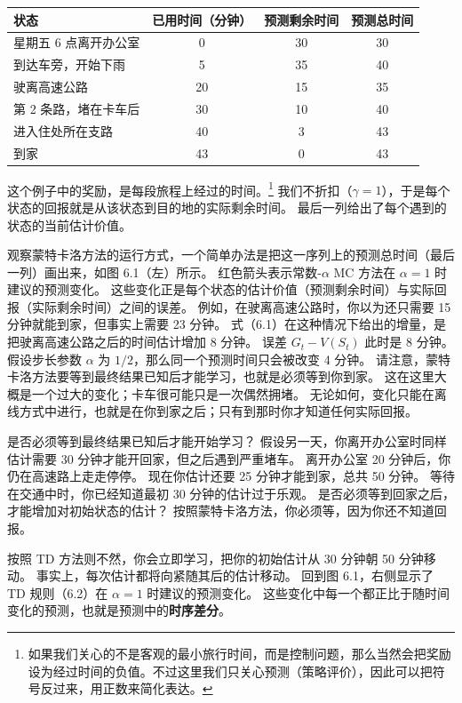 \documentclass[UTF8,12pt,a4paper,fontset=fandol]{ctexart}
\begin{document}
\begin{center}
\begin{tabular}{lccc}
\toprule
状态 & 已用时间（分钟） & 预测剩余时间 & 预测总时间 \\
\midrule
星期五 6 点离开办公室 & 0 & 30 & 30 \\
到达车旁，开始下雨 & 5 & 35 & 40 \\
驶离高速公路 & 20 & 15 & 35 \\
第 2 条路，堵在卡车后 & 30 & 10 & 40 \\
进入住处所在支路 & 40 & 3 & 43 \\
到家 & 43 & 0 & 43 \\
\bottomrule
\end{tabular}
\end{center}

这个例子中的奖励，是每段旅程上经过的时间。\footnote{如果我们关心的不是客观的最小旅行时间，而是控制问题，那么当然会把奖励设为经过时间的负值。不过这里我们只关心预测（策略评价），因此可以把符号反过来，用正数来简化表达。}
我们不折扣（$\gamma=1$），于是每个状态的回报就是从该状态到目的地的实际剩余时间。
最后一列给出了每个遇到的状态的当前估计价值。

观察蒙特卡洛方法的运行方式，一个简单办法是把这一序列上的预测总时间（最后一列）画出来，如图 6.1（左）所示。
红色箭头表示常数-$\alpha$ MC 方法在 $\alpha=1$ 时建议的预测变化。
这些变化正是每个状态的估计价值（预测剩余时间）与实际回报（实际剩余时间）之间的误差。
例如，在驶离高速公路时，你以为还只需要 15 分钟就能到家，但事实上需要 23 分钟。
式（6.1）在这种情况下给出的增量，是把驶离高速公路之后的时间估计增加 8 分钟。
误差 $G_t-V(S_t)$ 此时是 8 分钟。
假设步长参数 $\alpha$ 为 $1/2$，那么同一个预测时间只会被改变 4 分钟。
请注意，蒙特卡洛方法要等到最终结果已知后才能学习，也就是必须等到你到家。
这在这里大概是一个过大的变化；卡车很可能只是一次偶然拥堵。
无论如何，变化只能在离线方式中进行，也就是在你到家之后；只有到那时你才知道任何实际回报。

是否必须等到最终结果已知后才能开始学习？
假设另一天，你离开办公室时同样估计需要 30 分钟才能开回家，但之后遇到严重堵车。
离开办公室 20 分钟后，你仍在高速路上走走停停。
现在你估计还要 25 分钟才能到家，总共 50 分钟。
等待在交通中时，你已经知道最初 30 分钟的估计过于乐观。
是否必须等到回家之后，才能增加对初始状态的估计？
按照蒙特卡洛方法，你必须等，因为你还不知道回报。

按照 TD 方法则不然，你会立即学习，把你的初始估计从 30 分钟朝 50 分钟移动。
事实上，每次估计都将向紧随其后的估计移动。
回到图 6.1，右侧显示了 TD 规则（6.2）在 $\alpha=1$ 时建议的预测变化。
这些变化中每一个都正比于随时间变化的预测，也就是预测中的\textbf{时序差分}。
\end{document}
